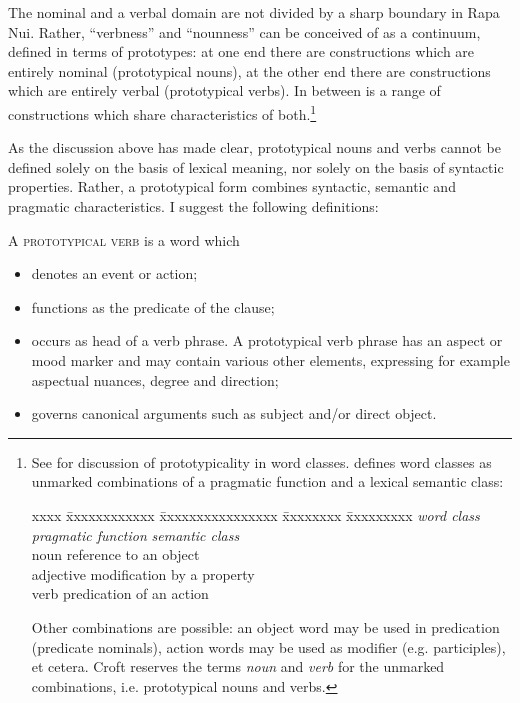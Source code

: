 \largerpage
The nominal and a verbal domain are not divided by a sharp boundary in Rapa Nui. Rather, “verbness” and “nounness” can be conceived of as a continuum, defined in terms of prototypes: at one end there are constructions which are entirely nominal (prototypical nouns), at the other end there are constructions which are entirely verbal (prototypical verbs). In between is a range of constructions which share characteristics of both.\footnote{\label{fn:95}See \citet[34–38]{Payne1997} for discussion of prototypicality in word classes. \citet{Croft2000} defines word classes as unmarked combinations of a pragmatic function and a lexical semantic class: 
\begin{tabbing}
xxxx \= xxxxxxxxxxxx \= xxxxxxxxxxxxxxxx \= xxxxxxxx \= xxxxxxxxx \kill
\> \textit{word class} \> \textit{pragmatic function} \> \>  \textit{semantic class}\\
\> noun \> reference \> to an \> object\\
\> adjective \> modification \> by a\>  property\\
\> verb \> predication \> of an\>  action
\end{tabbing}
Other combinations are possible: an object word may be used in predication (predicate nominals), action words may be used as modifier (e.g. participles), et cetera. Croft reserves the terms \textit{noun} and \textit{verb} for the unmarked combinations, i.e. prototypical nouns and verbs.} 

As the discussion above has made clear, prototypical nouns and verbs cannot be defined solely on the basis of lexical meaning, nor solely on the basis of syntactic properties. Rather, a prototypical form combines syntactic, semantic and pragmatic characteristics. I suggest the following definitions:

A \textsc{prototypical}\textsc{ verb} is a word which

\begin{itemize}
\item 
denotes an event or action;

\item 
functions as the predicate of the clause;

\item 
occurs as head of a verb phrase. A prototypical verb phrase has an aspect or mood marker and may contain various other elements, expressing for example aspectual nuances, degree and direction;

\item 
governs canonical arguments such as subject and/or direct object.

\end{itemize}

